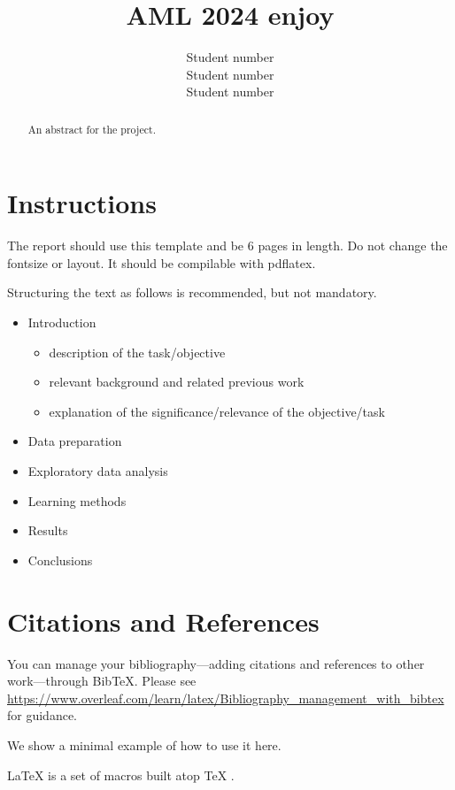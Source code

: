 \documentclass{article}
\title{AML 2024 enjoy}
\author{
  Student number\\
  \And
  Student number\\
 \And
  Student number\\
}
\begin{document}
\maketitle

\begin{abstract}
 An abstract for the project.
\end{abstract}

\section{Instructions}

The report should use this template and be 6 pages in length. Do not change the fontsize or layout. It should be compilable with pdflatex.

Structuring the text as follows is recommended, but not mandatory.

\begin{itemize}
\item Introduction
  \begin{itemize}
  \item description of the task/objective
  \item relevant background and related previous work
  \item explanation of the significance/relevance of the objective/task
  \end{itemize}
\item Data preparation
\item Exploratory data analysis
\item Learning methods
\item Results
\item Conclusions
\end{itemize}

\section*{Citations and References}
You can manage your bibliography---adding citations and references to other work---through BibTeX.
Please see \url{https://www.overleaf.com/learn/latex/Bibliography_management_with_bibtex} for guidance.

We show a minimal example of how to use it here.

\LaTeX{} \cite{latex2e} is a set of macros built atop \TeX{} \cite{texbook}.



\end{document}
